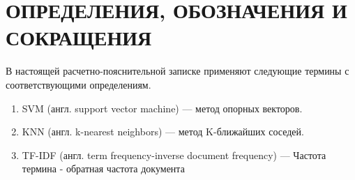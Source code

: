 \part*{ОПРЕДЕЛЕНИЯ, ОБОЗНАЧЕНИЯ И СОКРАЩЕНИЯ}
В настоящей расчетно-пояснительной записке применяют следующие термины с соответствующими определениям.
\begin{enumerate}
    \item SVM (англ. support vector machine) --- метод опорных векторов.
    \item KNN (англ. k-nearest neighbors) --- метод K-ближайших соседей.
    \item TF-IDF (англ. term frequency-inverse document frequency) --- Частота термина - обратная частота документа
\end{enumerate}
